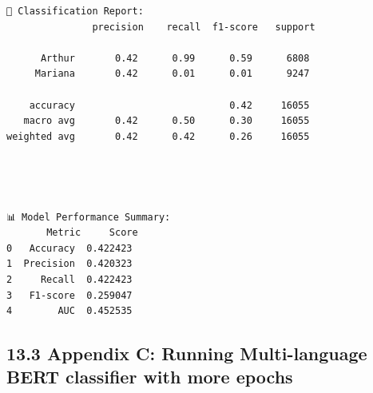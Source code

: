 \documentclass[11pt]{article}
\begin{document}
    \begin{Verbatim}[commandchars=\\\{\}]
📌 Classification Report:
               precision    recall  f1-score   support

      Arthur       0.42      0.99      0.59      6808
     Mariana       0.42      0.01      0.01      9247

    accuracy                           0.42     16055
   macro avg       0.42      0.50      0.30     16055
weighted avg       0.42      0.42      0.26     16055

    \end{Verbatim}

    \begin{center}
    \end{center}
    { \hspace*{\fill} \\}
    
    \begin{center}
    \end{center}
    { \hspace*{\fill} \\}
    
    \begin{Verbatim}[commandchars=\\\{\}]
📊 Model Performance Summary:
       Metric     Score
0   Accuracy  0.422423
1  Precision  0.420323
2     Recall  0.422423
3   F1-score  0.259047
4        AUC  0.452535
    \end{Verbatim}

    \subsection{13.3 Appendix C: Running Multi-language BERT classifier with
more
epochs}\label{appendix-c-running-multi-language-bert-classifier-with-more-epochs}
\end{document}
